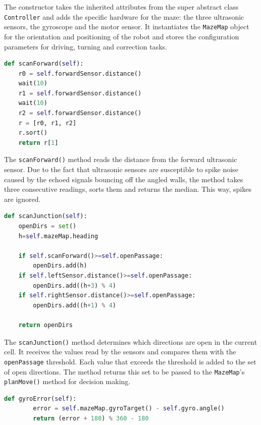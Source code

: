 The constructor takes the inherited attributes from the super abstract class \texttt{Controller} and adds the specific hardware for the maze: the three ultrasonic sensors, the gyroscope and the motor sensor. It instantiates the \texttt{MazeMap} object for the orientation and positioning of the robot and stores the configuration parameters for driving, turning and correction tasks. 

\begin{lstlisting}[language=Python, caption={MazeSolverController reading forward}, label={lst:lk-init}]
def scanForward(self):
    r0 = self.forwardSensor.distance()
    wait(10)
    r1 = self.forwardSensor.distance()
    wait(10)
    r2 = self.forwardSensor.distance()
    r = [r0, r1, r2]
    r.sort()
    return r[1]
\end{lstlisting}

The \texttt{scanForward()} method reads the distance from the forward ultrasonic sensor. Due to the fact that ultrasonic sensors are susceptible to spike noise caused by the echoed signals bouncing off the angled walls, the method takes three consecutive readings, sorts them and returns the median. This way, spikes are ignored. 

\begin{lstlisting}[language=Python, caption={MazeSolverController reading every direction}, label={lst:lk-init}]
def scanJunction(self):
    openDirs = set()
    h=self.mazeMap.heading
    
    if self.scanForward()>=self.openPassage:
        openDirs.add(h)
    if self.leftSensor.distance()>=self.openPassage:
        openDirs.add((h+3) % 4)
    if self.rightSensor.distance()>=self.openPassage:
        openDirs.add((h+1) % 4)
        
    return openDirs
\end{lstlisting}

The \texttt{scanJunction()} method determines which directions are open in the current cell. It receives the values read by the sensors and compares them with the \texttt{openPassage} threshold. Each value that exceeds the threshold is added to the set of open directions. The method returns this set to be passed to the \texttt{MazeMap}’s \texttt{planMove()} method for decision making.

\begin{lstlisting}[language=Python, caption={MazeSolverController gyro error computing}, label={lst:lk-init}]
def gyroError(self):
        error = self.mazeMap.gyroTarget() - self.gyro.angle()
        return (error + 180) % 360 - 180
\end{lstlisting}

